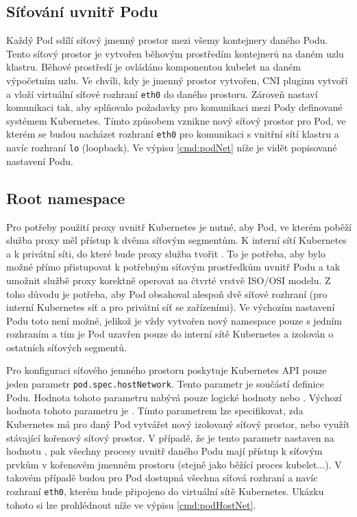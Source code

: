 \subsection{Síťování uvnitř Podu}
Každý Pod sdílí síťový jmenný prostor mezi všemy kontejnery daného Podu. Tento síťový prostor je vytvořen běhovým prostředím kontejnerů na daném uzlu klastru. Běhové prostředí je ovládáno komponentou kubelet na daném výpočetním uzlu. Ve chvíli, kdy je jmenný prostor vytvořen, CNI pluginu vytvoří a vloží virtuální síťové rozhraní \verb|eth0| do daného prostoru. Zároveň nastaví komunikaci tak, aby splňovalo požadavky pro komunikaci mezi Pody definované systémem Kubernetes. Tímto způsobem vznikne nový síťový prostor pro Pod, ve kterém se budou nacházet rozhraní \verb|eth0| pro komunikaci s vnitřní sítí klastru a navíc rozhraní \verb|lo| (loopback). Ve výpisu \ref{cmd:podNet} níže je vidět popisované nastavení Podu.



\subsection{Root namespace}
Pro potřeby použití proxy uvnitř Kubernetes je nutné, aby Pod, ve kterém poběží služba proxy měl přístup k dvěma síťovým segmentům. K interní sítí Kubernetes a k privátní síti, do které bude proxy služba tvořit . To je potřeba, aby bylo možné přímo přistupovat k potřebným síťovým prostředkům uvnitř Podu a tak umožnit službě proxy korektně operovat na čtvrté vrstvě ISO/OSI modelu. Z toho důvodu je potřeba, aby Pod obsahoval alespoň dvě síťové rozhraní (pro interní Kubernetes síť a pro privátní síť se zařízeními). Ve výchozím nastavení Podu toto není možné, jelikož je vždy vytvořen nový namespace pouze s jedním rozhraním a tím je Pod uzavřen pouze do interní sítě Kubernetes a izolován o ostatních síťových segmentů.

Pro konfiguraci síťového jemného prostoru poskytuje Kubernetes API pouze jeden parametr \verb|pod.spec.hostNetwork|. Tento parametr je součástí definice Podu. Hodnota tohoto parametru nabývá pouze logické hodnoty  nebo . Výchozí hodnota tohoto parametru je . Tímto parametrem lze specifikovat, zda Kubernetes má pro daný Pod vytvářet nový izolovaný síťový prostor, nebo využít stávající kořenový síťový prostor. V případě, že je tento parametr nastaven na hodnotu , pak všechny procesy uvnitř daného Podu mají přístup k síťovým prvkům v kořenovém jmenném prostoru (stejně jako běžící proces kubelet...). V takovém případě budou pro Pod dostupná všechna síťová rozhraní a navíc rozhraní \verb|eth0|, kterém bude připojeno do virtuální sítě Kubernetes. Ukázku tohoto si lze prohlédnout níže ve výpisu \ref{cmd:podHostNet}.

